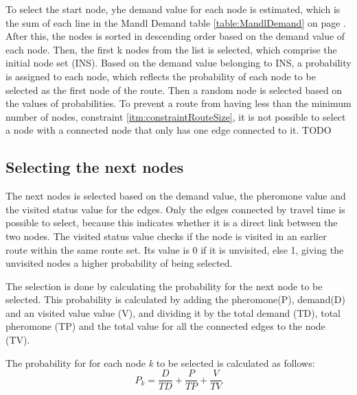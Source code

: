 To select the start node, yhe demand value for each node is estimated, which is the sum of each line in the Mandl Demand table \ref{table:MandlDemand} on page \pageref{table:MandlDemand}. After this, the nodes is sorted in descending order based on the demand value of each node. Then, the first k nodes from the list is selected, which comprise the initial node set (INS). Based on the demand value belonging to INS, a probability is assigned to each node, which reflects the probability of each node to be selected as the first node of the route. Then a random node is selected based on the values of probabilities. %
To prevent a route from having less than the minimum number of nodes, constraint \ref{itm:constraintRouteSize}, it is not possible to select a node with a connected node that only has one edge connected to it. TODO

\subsection{Selecting the next nodes}

\begin{algorithm}[H]
\end{algorithm}

The next nodes is selected based on the demand value, the pheromone value and the visited status value for the edges. Only the edges connected by travel time is possible to select, because this indicates whether it is a direct link between the two nodes. The visited status value checks if the node is visited in an earlier route within the same route set. Its value is 0 if it is unvisited, else 1, giving the unvisited nodes a higher probability of being selected. 

The selection is done by calculating the probability for the next node to be selected. This probability is calculated by adding the pheromone(P), demand(D) and an visited value value (V), and dividing it by the total demand (TD), total pheromone (TP) and the total value for all the connected edges to the node (TV).

The probability for for each node \textit{k} to be selected is calculated as follows:
$$ P_{k} = \frac{D}{TD} + \frac{P}{TP} + \frac{V}{TV}$$ 

